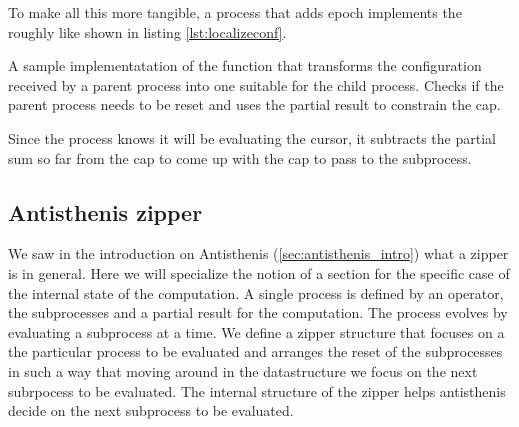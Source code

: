 To make all this more tangible, a process that adds epoch implements
the  roughly like shown in listing
\ref{lst:localizeconf}.

\begin{code}
\label{lst:localizeconf}
\caption{A sample implementatation of the function that transforms the
  configuration received by a parent process into one suitable for the
  child process. Checks if the parent process needs to be reset and
  uses the partial result to constrain the cap.}
\end{code}

Since the process knows it will be evaluating the cursor, it subtracts
the partial sum so far from the cap to come up with the cap to pass to
the subprocess.


\subsection{Antisthenis zipper}
\label{sec:zipper}
We saw in the introduction on Antisthenis
(\ref{sec:antisthenis_intro}) what a zipper is in general. Here we
will specialize the notion of a section for the specific case of the
internal state of the computation. A single process is defined by an
operator, the subprocesses and a partial result for the
computation. The process evolves by evaluating a subprocess at a
time. We define a zipper structure that focuses on a the particular
process to be evaluated and arranges the reset of the subprocesses in
such a way that moving around in the datastructure we focus on the
next subrpocess to be evaluated. The internal structure of the zipper
helps antisthenis decide on the next subprocess to be evaluated.


